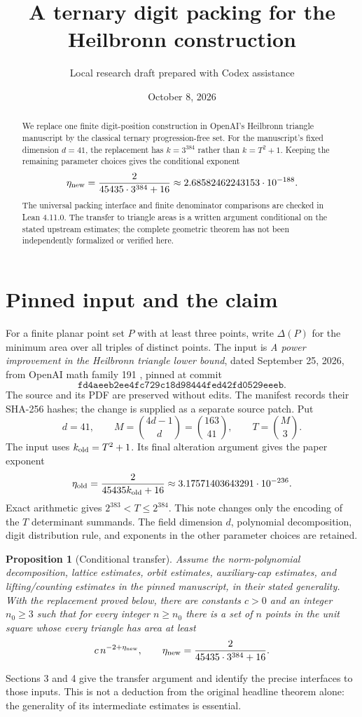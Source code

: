 \documentclass[11pt]{article}
\title{A ternary digit packing for the Heilbronn construction}
\author{Local research draft prepared with Codex assistance}
\date{October 8, 2026}
\newtheorem{proposition}[theorem]{Proposition}
\begin{document}
\maketitle
\begin{abstract}
We replace one finite digit-position construction in OpenAI's Heilbronn
triangle manuscript by the classical ternary progression-free set.
For the manuscript's fixed dimension \(d=41\), the replacement has
\(k=3^{384}\) rather than \(k=T^2+1\).
Keeping the remaining parameter choices gives the conditional exponent
\[
 \eta_{\rm new}=\frac{2}{45435\cdot3^{384}+16}
       \approx 2.68582462243153\cdot10^{-188}.
\]
The universal packing interface and finite denominator comparisons are
checked in Lean 4.11.0. The transfer to triangle areas is a written
argument conditional on the stated upstream estimates; the complete
geometric theorem has not been independently formalized or verified here.
\end{abstract}

\section{Pinned input and the claim}
For a finite planar point set \(P\) with at least three points, write
\(\Delta(P)\) for the minimum area over all triples of distinct points.
The input is \emph{A power improvement in the Heilbronn triangle lower
bound}, dated September 25, 2026, from OpenAI math family 191
\cite{upstream}, pinned at commit
\[
\texttt{fd4aeeb2ee4fc729c18d98444fed42fd0529eeeb}.
\]
The source and its PDF are preserved without edits. The manifest records
their SHA-256 hashes; the change is supplied as a separate source patch.
Put
\[
 d=41,\qquad M=\binom{4d-1}{d}=\binom{163}{41},\qquad T=\binom{M}{3}.
\]
The input uses \(k_{\rm old}=T^2+1\). Its final alteration argument gives
the paper exponent
\[
 \eta_{\rm old}=\frac{2}{45435k_{\rm old}+16}
       \approx3.17571403643291\cdot10^{-236}.
\]
Exact arithmetic gives \(2^{383}<T\le2^{384}\).
This note changes only the encoding of the \(T\) determinant summands.
The field dimension \(d\), polynomial decomposition, digit distribution
rule, and exponents in the other parameter choices are retained.

\begin{proposition}[Conditional transfer]\label{prop:transfer}
Assume the norm-polynomial decomposition, lattice estimates, orbit
estimates, auxiliary-cap estimates, and lifting/counting estimates in
the pinned manuscript, in their stated generality. With the replacement
proved below, there are constants \(c>0\) and an integer \(n_0\ge3\) such that
for every integer \(n\ge n_0\) there is a set of \(n\) points in the
unit square whose every triangle has area at least
\[
 c\,n^{-2+\eta_{\rm new}},
 \qquad \eta_{\rm new}=\frac{2}{45435\cdot3^{384}+16}.
\]
\end{proposition}
Sections 3 and 4 give the transfer argument and identify the precise
interfaces to those inputs. This is not a deduction from the original
headline theorem alone: the generality of its intermediate estimates
is essential.
\end{document}
